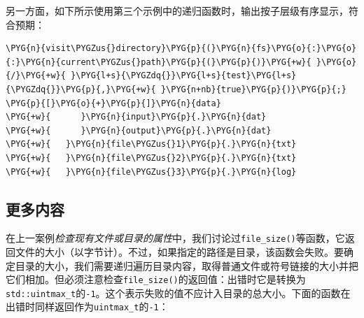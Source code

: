 
另一方面，如下所示使用第三个示例中的递归函数时，输出按子层级有序显示，符合预期：



\begin{codeblockbg}
\begin{Verbatim}[commandchars=\\\{\},breaklines=true,breakanywhere=true,fontsize=\codefont,xleftmargin=17bp]
\PYG{n}{visit\PYGZus{}directory}\PYG{p}{(}\PYG{n}{fs}\PYG{o}{:}\PYG{o}{:}\PYG{n}{current\PYGZus{}path}\PYG{p}{(}\PYG{p}{)}\PYG{+w}{ }\PYG{o}{/}\PYG{+w}{ }\PYG{l+s}{\PYGZdq{}}\PYG{l+s}{test}\PYG{l+s}{\PYGZdq{}}\PYG{p}{,}\PYG{+w}{ }\PYG{n+nb}{true}\PYG{p}{)}\PYG{p}{;}
\PYG{p}{[}\PYG{o}{+}\PYG{p}{]}\PYG{n}{data}
\PYG{+w}{      }\PYG{n}{input}\PYG{p}{.}\PYG{n}{dat}
\PYG{+w}{      }\PYG{n}{output}\PYG{p}{.}\PYG{n}{dat}
\PYG{+w}{   }\PYG{n}{file\PYGZus{}1}\PYG{p}{.}\PYG{n}{txt}
\PYG{+w}{   }\PYG{n}{file\PYGZus{}2}\PYG{p}{.}\PYG{n}{txt}
\PYG{+w}{   }\PYG{n}{file\PYGZus{}3}\PYG{p}{.}\PYG{n}{log}
\end{Verbatim}
\end{codeblockbg}



\subsection{更多内容}



在上一案例\textit{检查现有文件或目录的属性}中，我们讨论过\texttt{file\_\allowbreak{}size()}等函数，它返回文件的大小（以字节计）。不过，如果指定的路径是目录，该函数会失败。要确定目录的大小，我们需要递归遍历目录内容，取得普通文件或符号链接的大小并把它们相加。但必须注意检查\texttt{file\_\allowbreak{}size()}的返回值：出错时它是转换为\texttt{std::\allowbreak{}uintmax\_\allowbreak{}t}的\texttt{-\allowbreak{}1}。这个表示失败的值不应计入目录的总大小。下面的函数在出错时同样返回作为\texttt{uintmax\_\allowbreak{}t}的\texttt{-\allowbreak{}1}：



